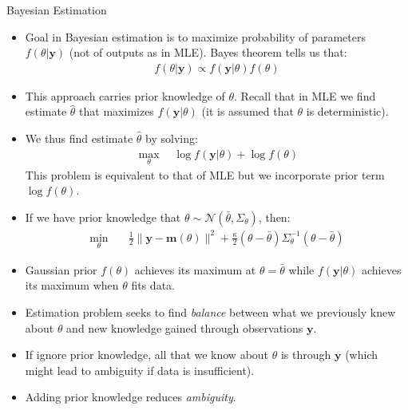 \documentclass[9pt]{beamer}
\begin{document}
%
\begin{frame}{Bayesian Estimation}

\begin{itemize}
\item Goal in Bayesian estimation is to maximize probability of parameters $f(\theta|\mathbf{y})$ (not of outputs as in MLE). Bayes theorem tells us that:
\begin{align*}
f(\theta|\mathbf{y})\propto f(\mathbf{y}|\theta)f(\theta)
\end{align*}
\item This approach carries prior knowledge of $\theta$.  Recall that in MLE we find estimate $\hat{\theta}$ that maximizes $f(\mathbf{y}|\theta)$ (it is assumed that $\theta$ is deterministic). 

\item We thus find estimate $\hat{\theta}$ by solving:
\begin{align*}
\max_\theta\quad  \log f(\mathbf{y}|\theta)+\log f(\theta)
\end{align*}
This problem is equivalent to that of MLE but we incorporate prior term $\log f(\theta)$. 
\item If we have prior knowledge that $\theta\sim \mathcal{N}(\bar{\theta},\Sigma_\theta)$, then: 
\begin{align*}
\min_{\theta}& \quad \frac{1}{2}\|\mathbf{y}- \mathbf{m}(\theta)\|^2+\frac{\kappa}{2}(\theta-\bar{\theta})\Sigma_\theta^{-1}(\theta-\bar{\theta})  
\end{align*}
\item Gaussian prior $f(\theta)$ achieves its maximum at $\theta=\bar{\theta}$ while $f(\mathbf{y}|\theta)$ achieves its maximum when $\theta$ fits data. 
\item Estimation problem seeks to find {\em balance} between what we previously knew about $\theta$ and new knowledge gained through observations $\mathbf{y}$. 
\item If ignore prior knowledge, all that we know about $\theta$ is through $\mathbf{y}$ (which might lead to ambiguity if data is insufficient). 
\item Adding prior knowledge reduces {\em ambiguity}. 
\end{itemize}

\end{frame}
\end{document}

